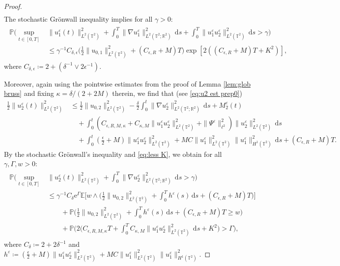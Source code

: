 \documentclass{amsart}
\newcommand{\dd}{\,\mathrm{d}}
\newcommand{\e}{\mathrm{e}}
\newcommand{\<}{\langle}
\newcommand{\?}{\rangle}
\newcommand{\ceqq}{\coloneqq}
\newcommand{\bphieps}{\Psi^{\eps}}
\newcommand{\Tor}{\mathbb{T}}
\renewcommand{\Tor}{\mathbb{T}^2}
\theoremstyle{plain}
\theoremstyle{remark}
\theoremstyle{plain}
\numberwithin{equation}{section}
\def\R{{\mathbb R}}
\renewcommand{\P}{\mathbb{P}}
\newcommand{\eps}{\varepsilon}
\begin{document}
\begin{proof}
\begin{align*}
\end{align*}  
The stochastic Gr\"onwall inequality \cite[Cor.\ 5.4b)]{geiss24} implies for all $\gamma>0$:    
\begin{align}\label{eq:u1 est tilt}
\begin{split}
   \P\Big(\sup_{t\in [0,T]}&\|u_1^\eps(t)\|_{L^2(\Tor)}^2 +\textstyle{\int_0^T} \|\nabla u_1^\eps\|_{L^2(\Tor;\R^2)}^2\dd s+\textstyle{\int_0^T} \|u_1^\eps u_2^\eps\|_{L^2(\Tor)}^2\dd s>\gamma\Big)\\ 
   &\leq \gamma^{-1}C_{\delta,\epsilon}\big(\tfrac12\|u_{0,1}\|_{L^2(\Tor)}^2+(C_{\epsilon,R}+M)T\big)\exp[2((C_{\epsilon,R}+M)T+K^2)],  
\end{split}
   \end{align} 
where $C_{\delta,\epsilon}\ceqq  2+ (\delta^{-1}\vee 2\epsilon^{-1})$. 
 
Moreover, again using the pointwise estimates from the proof of Lemma \ref{lem:glob bruss} and fixing $\kappa=\delta/(2+2M)$ therein,  we find that  (see \eqref{eq:u2 est prep0})
\begin{align*}
  \tfrac12 \|u_2^\eps(t)\|_{L^2(\Tor)}^2  &\leq \tfrac12 \|u_{0,2}\|_{L^2(\Tor)}^2 -\tfrac{\delta}{2}\int_0^t\|\nabla u_2^\eps\|_{L^2(\Tor;\R^2)}^2\dd s+ M_2^\eps(t)\\
   &\quad+ \int_0^t (C_{\epsilon,{R},M,\kappa}+C_{\kappa,M}\|u_1^\eps u_2^\eps\|_{L^2(\Tor)}^2 +\|\bphieps\|_{\ell^2}^2) \|u_2^\eps\|_{L^2(\Tor )}^2 \dd s\\
   &\quad+ \int_0^t(\tfrac{\epsilon}{2}+M)\|u_1^\eps u_2^\eps\|_{L^2(\Tor)}^2+MC\|u_1^\eps\|_{L^2(\Tor)}^2\|u_1^\eps\|_{H^1(\Tor)}^2\dd s+ (C_{\epsilon,R}+M)T.
\end{align*} 
By the stochastic Gr\"onwall's inequality \cite[Cor.\ 5.4b)]{geiss24} and \eqref{eq:less K}, we obtain for all $\gamma,\Gamma,w>0$:
\begin{align}\label{eq:u2 est tilt}
\begin{split}
\P\Big(\sup_{t\in [0,T]} &\|u_2^\eps(t)\|_{L^2(\Tor)}^2 +\textstyle{\int_0^{T}}\|\nabla u_2^\eps\|_{L^2(\Tor;\R^2)}^2\dd s>\gamma\Big)\\
&\leq  \gamma^{-1}C_{\delta}\e^{\Gamma}\mathbb{E}\Big[w\wedge \big( \tfrac12\|u_{0,2}\|_{L^2(\Tor)}^2+ \textstyle{\int_0^{T}}h^\eps(s)\dd s+(C_{\epsilon,R}+M)T \big)\Big]\\
&\qquad+\P\Big(\tfrac12\|u_{0,2}\|_{L^2(\Tor)}^2+ \textstyle{\int_0^{T}}h^\eps(s)\dd s+(C_{\epsilon,R}+M)T \geq w\Big)\\
&\qquad+\P\Big(2\big(C_{\epsilon,{R},M,\kappa}T+\textstyle{\int_0^{T}}C_{\kappa,M}\|u_1^\eps u_2^\eps\|_{L^2(\Tor)}^2  \dd s+K^2\big)>\Gamma\Big), 
\end{split}
\end{align}
where $C_\delta\ceqq 2+2\delta^{-1}$ and $h^{\eps}\ceqq (\tfrac{\epsilon}{2}+M)\|u_1^\eps u_2^\eps\|_{L^2(\Tor)}^2+MC \|u_1^\eps\|_{L^2(\Tor)}^2\|u_1^\eps\|_{H^1(\Tor)}^2$. 


\end{proof}
\end{document}
